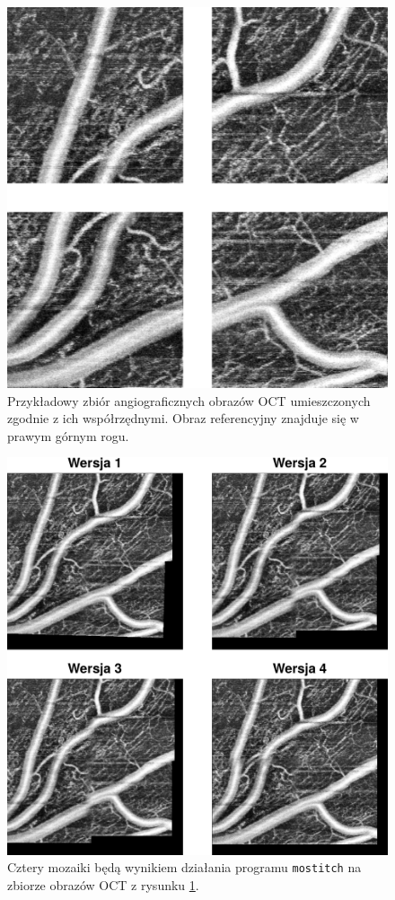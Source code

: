 \begin{figure}[htb]
  \centering
  \includegraphics[width=\textwidth]{gfx/zbior_1}
  \caption{Przykładowy zbiór angiograficznych obrazów OCT umieszczonych zgodnie z ich współrzędnymi. Obraz referencyjny znajduje się w prawym górnym rogu.}
  \label{fig:wyniki_eksperymentow:zbior_1}
\end{figure}

\begin{figure}[htb]
  \centering
  \includegraphics[width=\textwidth]{gfx/wynik_zbior_1}
  \caption{Cztery mozaiki będą wynikiem działania programu \texttt{mostitch} na zbiorze obrazów OCT z rysunku \ref{fig:wyniki_eksperymentow:zbior_1}.}
  \label{fig:wyniki_eksperymentow:wynik_zbior_1}
\end{figure}

